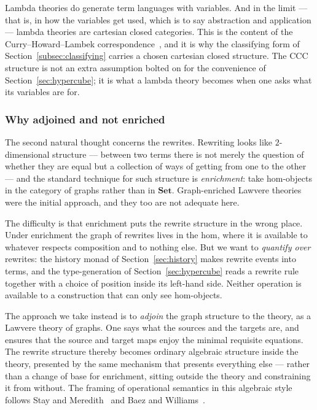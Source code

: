 \documentclass[11pt]{article}
\theoremstyle{definition}
\theoremstyle{plain}
\theoremstyle{remark}
\begin{document}
Lambda theories do generate term languages with variables. And in the limit --- that is,
in how the variables get used, which is to say abstraction and application --- lambda
theories are cartesian closed categories. This is the content of the
Curry--Howard--Lambek correspondence~\cite{LambekScott1986}, and it is why the
classifying form of Section~\ref{subsec:classifying} carries a chosen cartesian closed
structure. The CCC structure is not an extra assumption bolted on for the convenience of
Section~\ref{sec:hypercube}; it is what a lambda theory becomes when one asks what its
variables are for.

\subsubsection{Why adjoined and not enriched}

The second natural thought concerns the rewrites. Rewriting looks like $2$-dimensional
structure --- between two terms there is not merely the question of whether they are
equal but a collection of ways of getting from one to the other --- and the standard
technique for such structure is \emph{enrichment}: take hom-objects in the category of
graphs rather than in $\mathbf{Set}$. Graph-enriched Lawvere theories were the initial
approach, and they too are not adequate here.

The difficulty is that enrichment puts the rewrite structure in the wrong place. Under
enrichment the graph of rewrites lives in the hom, where it is available to whatever
respects composition and to nothing else. But we want to \emph{quantify over} rewrites:
the history monad of Section~\ref{sec:history} makes rewrite events into terms, and the
type-generation of Section~\ref{sec:hypercube} reads a rewrite rule together with a
choice of position inside its left-hand side. Neither operation is available to a
construction that can only see hom-objects.

The approach we take instead is to \emph{adjoin} the graph structure to the theory,
as a Lawvere theory of graphs. One says what the sources and the targets are, and ensures
that the source and target maps enjoy the minimal requisite equations. The rewrite
structure thereby becomes ordinary algebraic structure inside the theory, presented by
the same mechanism that presents everything else --- rather than a change of base for
enrichment, sitting outside the theory and constraining it from without. The framing of
operational semantics in this algebraic style follows Stay and
Meredith~\cite{StayMeredith2016} and Baez and Williams~\cite{BaezWilliams2020}.
\end{document}
